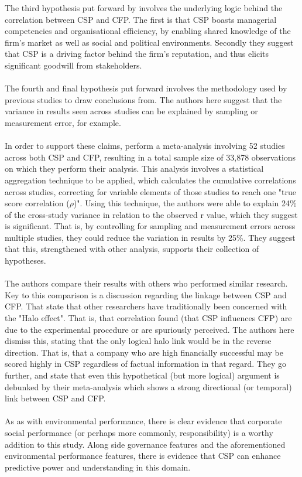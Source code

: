 {The third hypothesis put forward by \cite{orlitzky2003corporate} involves the underlying logic behind the correlation between CSP and CFP. The first is that CSP boasts managerial competencies and organisational efficiency, by enabling shared knowledge of the firm's market as well as social and political environments. Secondly they suggest that CSP is a driving factor behind the firm's reputation, and thus elicits significant goodwill from stakeholders. \\\\
The fourth and final hypothesis put forward involves the methodology used by previous studies to draw conclusions from. The authors here suggest that the variance in results seen across studies can be explained by sampling or measurement error, for example. \\\\
In order to support these claims, \cite{orlitzky2003corporate} perform a meta-analysis involving 52 studies across both CSP and CFP, resulting in a total sample size of 33,878 observations on which they perform their analysis. This analysis involves a statistical aggregation technique to be applied, which calculates the cumulative correlations across studies, correcting for variable elements of those studies to reach one "true score correlation ($\rho$)". Using this technique, the authors were able to explain 24\% of the cross-study variance in relation to the observed r value, which they suggest is significant. That is, by controlling for sampling and measurement errors across multiple studies, they could reduce the variation in results by 25\%. They suggest that this, strengthened with other analysis, supports their collection of hypotheses.\\\\
The authors compare their results with others who performed similar research. Key to this comparison is a discussion regarding the linkage between CSP and CFP. That state that other researchers have traditionally been concerned with the "Halo effect". That is, that correlation found (that CSP influences CFP) are due to the experimental procedure or are spuriously perceived. The authors here dismiss this, stating that the only logical halo link would be in the reverse direction. That is, that a company who are high financially successful may be scored highly in CSP regardless of factual information in that regard. They go further, and state that even this hypothetical (but more logical) argument is debunked by their meta-analysis which shows a strong directional (or temporal) link between CSP and CFP. \\\\
As as with environmental performance, there is clear evidence that corporate social performance (or perhaps more commonly, responsibility) is a worthy addition to this study. Along side governance features and the aforementioned environmental performance features, there is evidence that CSP can enhance predictive power and understanding in this domain.}

